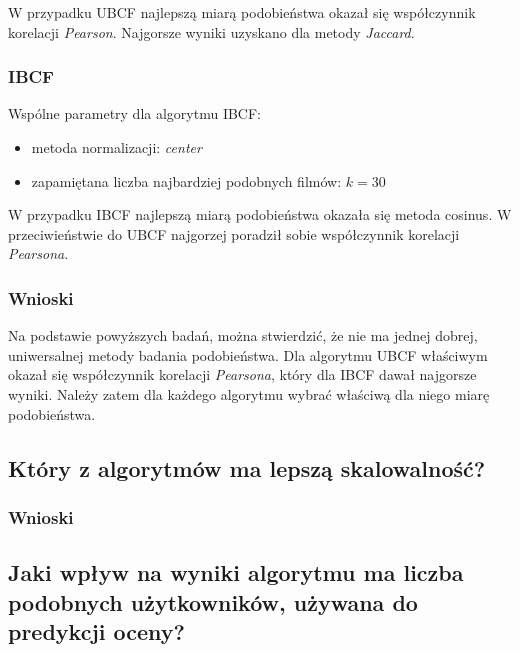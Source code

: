 \documentclass[12pt, a4paper]{article}
\begin{document}
W przypadku UBCF najlepszą miarą podobieństwa okazał się współczynnik korelacji \emph{Pearson}. Najgorsze wyniki uzyskano dla metody \emph{Jaccard}.



\subsubsection{IBCF}
Wspólne parametry dla algorytmu IBCF:
\begin{itemize}
\item metoda normalizacji: \emph{center}
\item zapamiętana liczba najbardziej podobnych filmów: $k = 30$
\end{itemize}

W przypadku IBCF najlepszą miarą podobieństwa okazała się metoda cosinus. W przeciwieństwie do UBCF najgorzej poradził sobie współczynnik korelacji \emph{Pearsona}.



\subsubsection{Wnioski}
Na podstawie powyższych badań, można stwierdzić, że nie ma jednej dobrej, uniwersalnej metody badania podobieństwa. Dla algorytmu UBCF właściwym okazał się współczynnik korelacji \emph{Pearsona}, który dla IBCF dawał najgorsze wyniki. Należy zatem dla każdego algorytmu wybrać właściwą dla niego miarę podobieństwa.


\subsection{Który z algorytmów ma lepszą skalowalność?}

\subsubsection{Wnioski}

\subsection{Jaki wpływ na wyniki algorytmu ma liczba podobnych użytkowników, używana do predykcji oceny?}
\end{document}
